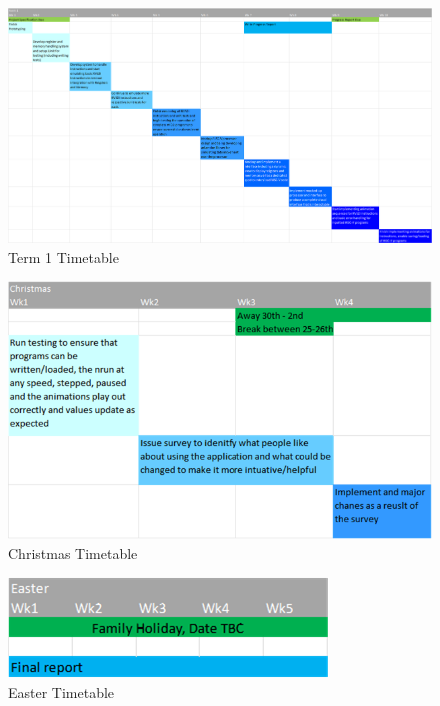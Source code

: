 \documentclass[a4paper,fleqn,12pt]{article}
\begin{document}
\begin{figure}[H]
    \centering
    \includegraphics[angle=90, scale=0.68]{specification/t1.png}
    \caption{Term 1 Timetable}
    \label{fig:timetable_t1}
\end{figure}
\begin{figure}[H]
    \centering
    \includegraphics[scale=0.65]{specification/christmas.png}
    \caption{Christmas Timetable}
    \label{fig:timetable_christmas}
\end{figure}
\begin{figure}[H]
    \centering
    \includegraphics[scale=0.85]{specification/easter.png}
    \caption{Easter Timetable}
    \label{fig:timetable_easter}
\end{figure}
\end{document}

